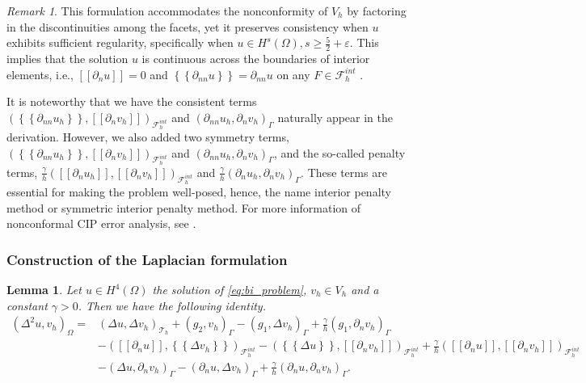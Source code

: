 \documentclass[11pt]{article}
\newtheorem{lemma}[theorem]{Lemma}
\theoremstyle{remark}
\newtheorem*{remark}{Remark}
\newcommand{\mean}[1]{\left\{\!\!\left\{#1\right\}\!\!\right\}}
\newcommand{\jump}[1]{\left[\!\left[ #1 \right]\!\right]}
\renewcommand{\ge}{\geqslant}
\numberwithin{equation}{section}
\begin{document}
\begin{remark}
    This formulation accommodates the nonconformity of $V_{h}$ by factoring in the discontinuities among the facets, yet it preserves consistency when $u$ exhibits sufficient regularity, specifically when $u\in H^{s}( \Omega ), s\ge \frac{5}{2} +
\varepsilon $. This implies that the solution $u$  is continuous across the boundaries of interior elements, i.e.,  $\jump{ \partial _{n} u }   = 0 $ and  $\mean{ \partial _{nn} u }   = \partial _{nn} u $ on any $ F \in \mathcal{F} ^{int}_{h} $ .

It is noteworthy that we have the consistent terms $\left( \mean{  \partial _{n n} u_{h} }, \jump{ \partial _{n }v_{h}} \right)_{\mathcal{F}_{h}^{int}} $ and $ \left(   \partial _{n n} u_{h} ,  \partial _{n }v_h \right)_{\Gamma }$ naturally appear in the
derivation. However, we also added two symmetry terms,  $\left( \mean{  \partial _{n n} u_{h} }, \jump{ \partial _{n }v_{h}}
\right)_{\mathcal{F}_{h}^{int}} $ and $ \left(   \partial _{n n} u_{h} ,  \partial _{n }v_{h} \right)_{\Gamma }$, and the so-called penalty terms, $ \frac{\gamma }{h}  \left( \jump{ \partial _{n} u_{h}}, \jump{ \partial _{n} v_{h}   }   \right)_{\mathcal{F}_{h}^{int}}$ and $ \frac{\gamma }{h}  \left(  \partial _{n} u_{h},  \partial _{n} v_{h}      \right)_{\Gamma }$.
     These terms are essential for making the problem well-posed, hence, the name interior penalty method or symmetric interior penalty method. For more information of  nonconformal CIP error analysis, see \cite[Chapter 1.3]{pietro2012}.
\end{remark}

\subsubsection{Construction of the Laplacian formulation}%
\label{ssub:construction_of_the_laplacian_formulation}


\begin{lemma}

 Let $u \in H^{4}( \Omega ) $ the solution of \eqref{eq:bi_problem}, $v_{h} \in  V_{h}$ and a constant $\gamma >0$. Then we have the following identity.
\[
    \begin{split}
( \Delta ^2 u, v_{h} ) _{\Omega }  =& ( \Delta u, \Delta v_{h})_{\mathcal{T} _{h} }  + ( g_{2} , v_{h} )_{\Gamma }  - ( g_{1} , \Delta v_{h})_{\Gamma } + \frac{\gamma }{h} ( g_{1} ,  \partial _{n}v_{h})_{\Gamma }\\
& -  ( \jump{ \partial _{n} u} , \mean{ \Delta v_{h} })_{\mathcal{F}_{h}^{int} }-  (  \mean{ \Delta u }, \jump{ \partial _{n} v_{h}} )_{\mathcal{F}_{h}^{int} } + \frac{\gamma }{h}  \left( \jump{ \partial _{n} u}, \jump{ \partial _{n} v_{h}   }
\right)_{\mathcal{F}_{h}^{int} } \\
& - (  \Delta u, \partial _{n} v_{h})_{\Gamma }- ( \partial _{n} u, \Delta v_{h})_{\Gamma } + \frac{\gamma }{h}( \partial _{n} u, \partial _{n} v_{h})_{\Gamma }   .
    \end{split}
\]
\end{lemma}
\end{document}
